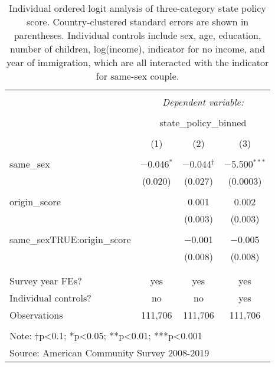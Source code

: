 \documentclass[
  11pt,
]{article}
\begin{document}
\begin{table}[!htbp] \centering 
  \caption{Individual ordered logit analysis of three-category state policy score. Country-clustered standard errors are shown in parentheses. Individual controls include sex, age, education, number of children, log(income), indicator for no income, and year of immigration, which are all interacted with the indicator for same-sex couple.} 
  \label{tab:ord} 
\begin{tabular}{@{\extracolsep{5pt}}lccc} 
\\[-1.8ex]\hline 
\hline \\[-1.8ex] 
 & \multicolumn{3}{c}{\textit{Dependent variable:}} \\ 
\cline{2-4} 
\\[-1.8ex] & \multicolumn{3}{c}{state\_policy\_binned} \\ 
\\[-1.8ex] & (1) & (2) & (3)\\ 
\hline \\[-1.8ex] 
 same\_sex & $-$0.046$^{*}$ & $-$0.044$^{†}$ & $-$5.500$^{***}$ \\ 
  & (0.020) & (0.027) & (0.0003) \\ 
  & & & \\ 
 origin\_score &  & 0.001 & 0.002 \\ 
  &  & (0.003) & (0.003) \\ 
  & & & \\ 
 same\_sexTRUE:origin\_score &  & $-$0.001 & $-$0.005 \\ 
  &  & (0.008) & (0.008) \\ 
  & & & \\ 
\hline \\[-1.8ex] 
Survey year FEs? & yes & yes & yes \\ 
Individual controls? & no & no & yes \\ 
Observations & 111,706 & 111,706 & 111,706 \\ 
\hline 
\hline \\[-1.8ex] 
\multicolumn{4}{l}{Note: †p<0.1; *p<0.05; **p<0.01; ***p<0.001} \\ 
\multicolumn{4}{l}{Source: American Community Survey 2008-2019} \\ 
\end{tabular} 
\end{table}
\end{document}
